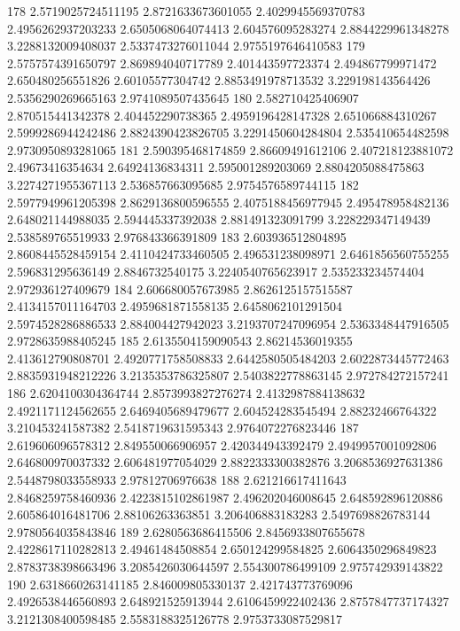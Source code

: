 178 2.5719025724511195 2.8721633673601055 2.4029945569370783 2.4956262937203233 2.6505068064074413 2.604576095283274 2.8844229961348278 3.2288132009408037 2.5337473276011044 2.9755197646410583
179 2.5757574391650797 2.869894040717789 2.401443597723374 2.494867799971472 2.650480256551826 2.60105577304742 2.8853491978713532 3.229198143564426 2.5356290269665163 2.9741089507435645
180 2.582710425406907 2.870515441342378 2.404452290738365 2.4959196428147328 2.651066884310267 2.5999286944242486 2.8824390423826705 3.2291450604284804 2.535410654482598 2.9730950893281065
181 2.590395468174859 2.86609491612106 2.407218123881072 2.49673416354634 2.64924136834311 2.595001289203069 2.8804205088475863 3.2274271955367113 2.536857663095685 2.9754576589744115
182 2.5977949961205398 2.8629136800596555 2.4075188456977945 2.495478958482136 2.648021144988035 2.594445337392038 2.881491323091799 3.228229347149439 2.538589765519933 2.976843366391809
183 2.603936512804895 2.8608445528459154 2.4110424733460505 2.496531238098971 2.6461856560755255 2.596831295636149 2.8846732540175 3.2240540765623917 2.535233234574404 2.972936127409679
184 2.606680057673985 2.8626125157515587 2.4134157011164703 2.4959681871558135 2.6458062101291504 2.5974528286886533 2.884004427942023 3.2193707247096954 2.5363348447916505 2.9728635988405245
185 2.6135504159090543 2.86214536019355 2.413612790808701 2.4920771758508833 2.6442580505484203 2.6022873445772463 2.8835931948212226 3.2135353786325807 2.5403822778863145 2.972784272157241
186 2.6204100304364744 2.8573993827276274 2.4132987884138632 2.4921171124562655 2.6469405689479677 2.604524283545494 2.88232466764322 3.210453241587382 2.5418719631595343 2.9764072276823446
187 2.619606096578312 2.849550066906957 2.420344943392479 2.4949957001092806 2.646800970037332 2.606481977054029 2.8822333300382876 3.2068536927631386 2.5448798033558933 2.97812706976638
188 2.621216617411643 2.8468259758460936 2.4223815102861987 2.496202046008645 2.648592896120886 2.605864016481706 2.88106263363851 3.206406883183283 2.5497698826783144 2.9780564035843846
189 2.6280563686415506 2.8456933807655678 2.4228617110282813 2.49461484508854 2.650124299584825 2.6064350296849823 2.8783738398663496 3.2085426030644597 2.554300786499109 2.975742939143822
190 2.6318660263141185 2.846009805330137 2.421743773769096 2.4926538446560893 2.648921525913944 2.6106459922402436 2.8757847737174327 3.2121308400598485 2.5583188325126778 2.9753733087529817
